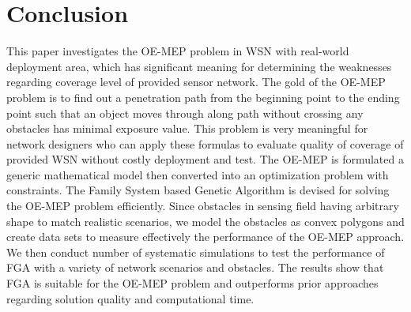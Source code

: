 \documentclass[final]{elsarticle}
\begin{document}
\section{Conclusion}
This paper investigates the OE-MEP problem in WSN with real-world deployment area, which has significant meaning for determining the weaknesses regarding coverage level of provided sensor network. The gold of the OE-MEP problem is to find out a penetration path from the beginning point to the ending point such that an object moves through along path without crossing any obstacles has minimal exposure value. This problem is very meaningful for network designers who can apply these formulas to evaluate quality of coverage of provided WSN without costly deployment and test. The OE-MEP is formulated a generic mathematical model then converted into an optimization problem with constraints. The Family System based Genetic Algorithm is devised for solving the OE-MEP problem efficiently. Since obstacles in sensing field having arbitrary shape to match realistic scenarios, we model the obstacles as convex polygons and create data sets to measure effectively the performance of the OE-MEP approach. We then conduct number of systematic simulations to test the performance of FGA with a variety of network scenarios and obstacles. The results show that FGA is suitable for the OE-MEP problem and outperforms prior approaches regarding solution quality and computational time. 
\begin{landscape}

\end{landscape}

\end{document}
